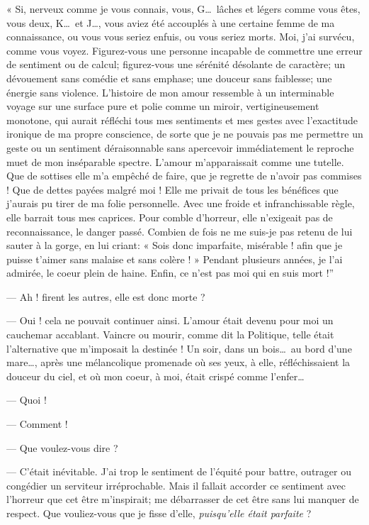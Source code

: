 « Si, nerveux comme je vous connais, vous, G\ldots\ lâches et légers comme
vous êtes, vous deux, K\ldots\ et J\ldots, vous aviez été accouplés à une
certaine femme de ma connaissance, ou vous vous seriez enfuis, ou vous
seriez morts. Moi, j’ai survécu, comme vous voyez.
Figurez{}-vous une personne incapable de commettre une erreur de
sentiment ou de calcul; figurez{}-vous une sérénité désolante de
caractère; un dévouement sans comédie et sans emphase; une douceur sans
faiblesse; une énergie sans violence. L’histoire de
mon amour ressemble à un interminable voyage sur une surface pure et
polie comme un miroir, vertigineusement monotone, qui aurait réfléchi
tous mes sentiments et mes gestes avec l’exactitude
ironique de ma propre conscience, de sorte que je ne pouvais pas me
permettre un geste ou un sentiment déraisonnable sans apercevoir
immédiatement le reproche muet de mon inséparable spectre.
L’amour m’apparaissait comme une
tutelle. Que de sottises elle m’a empêché de faire,
que je regrette de n’avoir pas commises ! Que de
dettes payées malgré moi ! Elle me privait de tous les bénéfices que
j’aurais pu tirer de ma folie personnelle. Avec une
froide et infranchissable règle, elle barrait tous mes caprices. Pour
comble d’horreur, elle n’exigeait pas
de reconnaissance, le danger passé. Combien de fois ne me suis{}-je pas
retenu de lui sauter à la gorge, en lui criant: « Sois donc imparfaite,
misérable ! afin que je puisse t’aimer sans malaise et
sans colère ! » Pendant plusieurs années, je l’ai
admirée, le coeur plein de haine. Enfin, ce n’est pas
moi qui en suis mort !''

--- Ah ! firent les autres, elle est donc morte ?

--- Oui ! cela ne pouvait continuer ainsi. L’amour était
devenu pour moi un cauchemar accablant. Vaincre ou mourir, comme dit la
Politique, telle était l’alternative que
m’imposait la destinée ! Un soir, dans un bois\ldots\ au
bord d’une mare\ldots, après une mélancolique promenade
où ses yeux, à elle, réfléchissaient la douceur du ciel, et où mon
coeur, à moi, était crispé comme l’enfer\ldots

--- Quoi !

--- Comment !

--- Que voulez{}-vous dire ?

--- C’était inévitable. J’ai trop le
sentiment de l’équité pour battre, outrager ou
congédier un serviteur irréprochable. Mais il fallait accorder ce
sentiment avec l’horreur que cet être
m’inspirait; me débarrasser de cet être sans lui
manquer de respect. Que vouliez{}-vous que je fisse
d’elle, \textit{puisqu’elle était parfaite} ?

